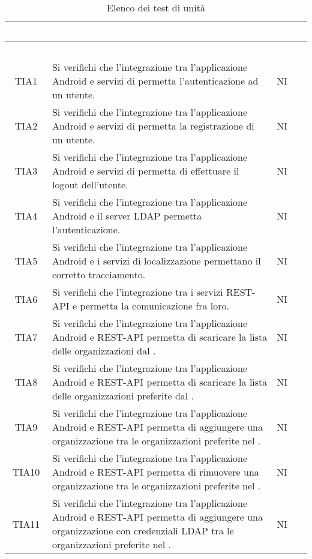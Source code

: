 {
\renewcommand{\arraystretch}{1.5}
\centering
\begin{longtable}{ c C{13cm} C{1cm}}
\caption{Elenco dei test di unità}\\
\textcolor{white}{\textbf{Codice}} & \textcolor{white}{\textbf{Descrizione}} & \textcolor{white}{\textbf{Stato}}\\
\endfirsthead
{}
\textcolor{white}{\textbf{Codice}} & \textcolor{white}{\textbf{Descrizione}} & \textcolor{white}{\textbf{Stato}}\\
\endhead

TIA1 & Si verifichi che l’integrazione tra l’applicazione Android e servizi di  permetta l’autenticazione ad un utente. & NI \\
TIA2 & Si verifichi che l’integrazione tra l’applicazione Android e servizi di  permetta la registrazione di un utente. & NI \\
TIA3 & Si verifichi che l’integrazione tra l’applicazione Android e servizi di  permetta di effettuare il logout dell'utente. & NI \\
TIA4 & Si verifichi che l’integrazione tra l’applicazione Android e il server LDAP permetta l’autenticazione. & NI \\
TIA5 & Si verifichi che l’integrazione tra l’applicazione Android e i servizi di localizzazione permettano il corretto tracciamento. & NI \\
TIA6 & Si verifichi che l’integrazione tra i servizi REST-API e  permetta la comunicazione fra loro. & NI \\
TIA7 & Si verifichi che l’integrazione tra l’applicazione Android e REST-API permetta di scaricare la lista delle organizzazioni dal . & NI \\
TIA8 & Si verifichi che l’integrazione tra l’applicazione Android e REST-API permetta di scaricare la lista delle organizzazioni preferite dal . & NI \\
TIA9 & Si verifichi che l’integrazione tra l’applicazione Android e REST-API permetta di aggiungere una organizzazione tra le organizzazioni preferite nel . & NI \\
TIA10 & Si verifichi che l’integrazione tra l’applicazione Android e REST-API permetta di rimuovere una organizzazione tra le organizzazioni preferite nel . & NI \\
TIA11 & Si verifichi che l’integrazione tra l’applicazione Android e REST-API permetta di aggiungere una organizzazione con credenziali LDAP tra le organizzazioni preferite nel . & NI \\

\end{longtable}}
